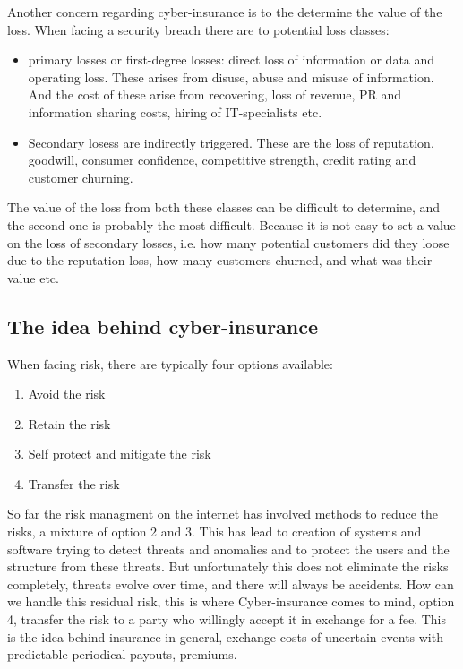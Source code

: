 Another concern regarding cyber-insurance is to the determine the value of the loss. When facing a security breach there are to potential loss classes:\cite{bandyopadhyay2009managers} 
\begin{itemize}
\item primary losses or first-degree losses: direct loss of information or data and operating loss. 
These arises from disuse, abuse and misuse of information.
 And the cost of these arise from recovering, loss of revenue, 
 PR and information sharing costs, hiring of IT-specialists etc.
 \item Secondary losess are indirectly triggered. These are the loss of reputation, goodwill, 
consumer confidence, competitive strength, credit rating and customer churning. 
\end{itemize}
The value of the loss from both these classes can be difficult to determine, and the second one is probably the most difficult. Because it is not easy to set a value on the loss of secondary losses, i.e. how many potential customers did they loose due to the reputation loss, how many customers churned, and what was their value etc.

\subsection{The idea behind cyber-insurance}
When facing risk, there are typically four options available:
\begin{enumerate}
\item Avoid the risk
\item Retain the risk
\item Self protect and mitigate the risk
\item Transfer the risk
\end{enumerate}
So far the risk managment on the internet has involved methods to reduce the risks, 
a mixture of option 2 and 3. This has lead to creation of systems and software trying to detect threats and anomalies and to protect the users and the structure from these threats. 
But unfortunately this does not eliminate the risks completely, threats evolve over time, 
and there will always be accidents. How can we handle this residual risk, 
this is where Cyber-insurance comes to mind, option 4, transfer the risk to a party who willingly accept it in exchange for a fee. This is the idea behind insurance in general, 
exchange costs of uncertain events with predictable periodical payouts, premiums.
\cite{bolot2008cyber}


